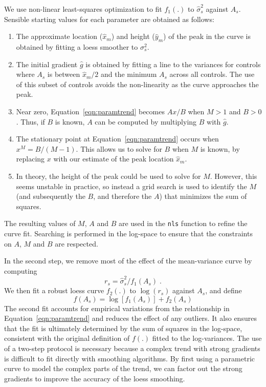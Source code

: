 \documentclass{article}
\begin{document}
We use non-linear least-squares optimization to fit $f_1(.)$ to $\hat\sigma^2_s$ against $A_s$.
Sensible starting values for each parameter are obtained as follows:
\begin{enumerate}
\item The approximate location ($\hat{x}_m$) and height ($\hat{y}_m$) of the peak in the curve is obtained by fitting a loess smoother to $\sigma^2_s$.
\item The initial gradient $\hat{g}$ is obtained by fitting a line to the variances for controls where $A_s$ is between $\hat{x}_m/2$ and the minimum $A_s$ across all controls.
The use of this subset of controls avoids the non-linearity as the curve approaches the peak.
\item Near zero, Equation~\ref{eqn:paramtrend} becomes $Ax/B$ when $M>1$ and $B>0$. 
Thus, if $B$ is known, $A$ can be computed by multiplying $B$ with $\hat{g}$.
\item The stationary point at Equation~\ref{eqn:paramtrend} occurs when $x^M = B/(M-1)$.
This allows us to solve for $B$ when $M$ is known, by replacing $x$ with our estimate of the peak location $\hat{x}_m$.
\item In theory, the height of the peak could be used to solve for $M$. 
However, this seems unstable in practice, so instead a grid search is used to identify the $M$ (and subsequently the $B$, and therefore the $A$) that minimizes the sum of squares.
\end{enumerate}
The resulting values of $M$, $A$ and $B$ are used in the \texttt{nls} function to refine the curve fit.
Searching is performed in the log-space to ensure that the constraints on $A$, $M$ and $B$ are respected.

In the second step, we remove most of the effect of the mean-variance curve by computing 
\[
    r_s = \hat\sigma^2_s/f_1(A_s) \;.
\]
We then fit a robust loess curve $f_2(.)$ to $\log(r_s)$ against $A_s$, and define
\[
    f(A_s) = \log[f_1(A_s)] + f_2(A_s)
\]
The second fit accounts for empirical variations from the relationship in Equation~\ref{eqn:paramtrend} and reduces the effect of any outliers.
It also ensures that the fit is ultimately determined by the sum of squares in the log-space, consistent with the original definition of $f(.)$ fitted to the log-variances.
The use of a two-step protocol is necessary because a complex trend with strong gradients is difficult to fit directly with smoothing algorithms.
By first using a parametric curve to model the complex parts of the trend, we can factor out the strong gradients to improve the accuracy of the loess smoothing.
\end{document}
